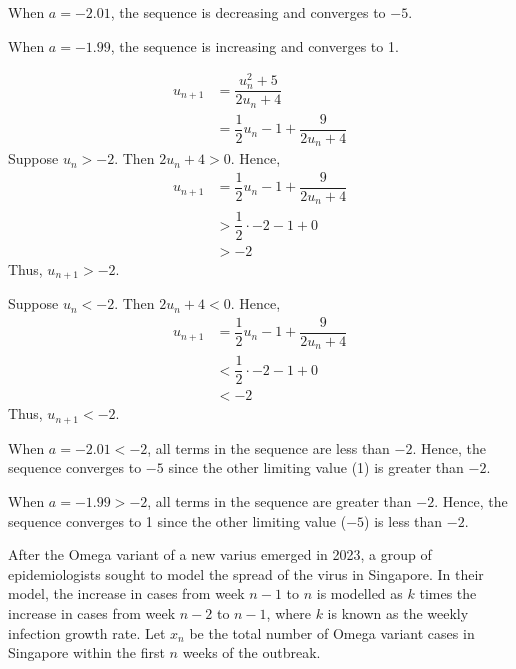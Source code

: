 \documentclass{jhwhw}
\begin{document}
            \subpart

                \noindent When $a = -2.01$, the sequence is decreasing and converges to $-5$. 
                
                \noindent When $a = -1.99$, the sequence is increasing and converges to 1.

            \subpart
                \begin{align*}
                    u_{n+1} &= \dfrac{u_n^2 + 5}{2u_n + 4}\\
                    &= \dfrac12 u_n - 1 + \dfrac9{2u_n + 4}
                \end{align*}
                Suppose $u_n > -2$. Then $2u_n + 4 > 0$. Hence,
                \begin{align*}
                    u_{n+1} &= \dfrac12 u_n - 1 + \dfrac9{2u_n + 4}\\
                    &> \dfrac12 \cdot -2 - 1 + 0\\
                    &> -2
                \end{align*}
                Thus, $u_{n+1} > -2$.

                \medskip

                \noindent Suppose $u_n < -2$. Then $2u_n + 4 < 0$. Hence,
                \begin{align*}
                    u_{n+1} &= \dfrac12 u_n - 1 + \dfrac9{2u_n + 4}\\
                    &< \dfrac12 \cdot -2 - 1 + 0\\
                    &< -2
                \end{align*}
                Thus, $u_{n+1} < -2$.

                \medskip

                \noindent When $a = -2.01 < -2$, all terms in the sequence are less than $-2$. Hence, the sequence converges to $-5$ since the other limiting value (1) is greater than $-2$.

                \noindent When $a = -1.99 > -2$, all terms in the sequence are greater than $-2$. Hence, the sequence converges to 1 since the other limiting value ($-5$) is less than $-2$.

    \problem{}
        After the Omega variant of a new varius emerged in 2023, a group of epidemiologists sought to model the spread of the virus in Singapore. In their model, the increase in cases from week $n-1$ to $n$ is modelled as $k$ times the increase in cases from week $n-2$ to $n-1$, where $k$ is known as the weekly infection growth rate. Let $x_n$ be the total number of Omega variant cases in Singapore within the first $n$ weeks of the outbreak.
\end{document}
